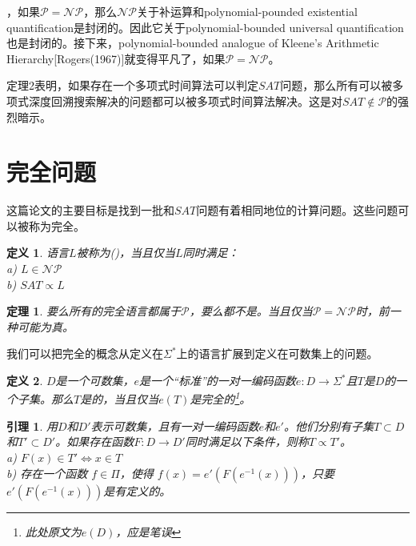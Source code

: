 \documentclass[twocolumn]{article}
\newtheorem{definition}{\hspace{2em}定义}
\newtheorem{lemma}{\hspace{2em}引理}
\newtheorem{theorem}{\hspace{2em}定理}
\theoremstyle{nonumberplain}%
\begin{document}
\begin{CJK}{UTF8}{gbsn}
    {}，如果$\mathcal{P}=\mathcal{NP}$，那么$\mathcal{NP}$关于补运算和polynomial-pounded existential quantification是封闭的。因此它关于polynomial-bounded universal quantification也是封闭的。接下来，polynomial-bounded analogue of Kleene's Arithmetic Hierarchy[Rogers(1967)]就变得平凡了，如果$\mathcal{P}=\mathcal{NP}$。
    
    定理2表明，如果存在一个多项式时间算法可以判定$SAT$问题，那么所有可以被多项式深度回溯搜索解决的问题都可以被多项式时间算法解决。这是对$SAT\not\in\mathcal{P}$的强烈暗示。
    
\section{完全问题}
    这篇论文的主要目标是找到一批和$SAT$问题有着相同地位的计算问题。这些问题可以被称为完全。
    \begin{definition}
        语言$L$被称为({}){}，当且仅当$L$同时满足：\\
        \indent a) $L\in\mathcal{NP}$\\
        \indent b) $SAT\propto L$\\
    \end{definition}
    
    \begin{theorem}
        要么所有的完全语言都属于$\mathcal{P}$，要么都不是。当且仅当$\mathcal{P}=\mathcal{NP}$时，前一种可能为真。
    \end{theorem}
    
    我们可以把完全的概念从定义在$\Sigma^*$上的语言扩展到定义在可数集上的问题。
    
    \begin{definition}
        $D$是一个可数集，$e$是一个“标准”的一对一编码函数$e:D\rightarrow\Sigma^*$且$T$是$D$的一个子集。那么$T$是{}的，当且仅当$e(T)$是完全的\footnote{此处原文为$e(D)$，应是笔误}。
    \end{definition}
    
    \begin{lemma}
        用$D$和$D'$表示可数集，且有一对一编码函数$e$和$e'$。他们分别有子集$T\subset D$和$T'\subset D'$。如果存在函数$F:D\rightarrow D'$同时满足以下条件，则称$T\propto T'$。\\
        \indent a) $F(x)\in T' \Leftrightarrow x\in T$\\
        \indent b) 存在一个函数 $f\in\Pi$，使得 $f(x)=e'(F(e^{-1}(x)))$，只要$e'(F(e^{-1}(x)))$是有定义的。\\
    \end{lemma}
    

\end{CJK}
\end{document}
